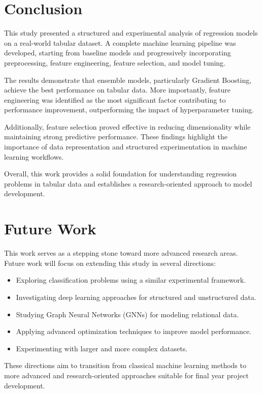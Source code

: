 \documentclass[conference]{IEEEtran}
\begin{document}
\section{Conclusion}

This study presented a structured and experimental analysis of regression models on a real-world tabular dataset. A complete machine learning pipeline was developed, starting from baseline models and progressively incorporating preprocessing, feature engineering, feature selection, and model tuning.

The results demonstrate that ensemble models, particularly Gradient Boosting, achieve the best performance on tabular data. More importantly, feature engineering was identified as the most significant factor contributing to performance improvement, outperforming the impact of hyperparameter tuning.

Additionally, feature selection proved effective in reducing dimensionality while maintaining strong predictive performance. These findings highlight the importance of data representation and structured experimentation in machine learning workflows.

Overall, this work provides a solid foundation for understanding regression problems in tabular data and establishes a research-oriented approach to model development.

\section{Future Work}

This work serves as a stepping stone toward more advanced research areas. Future work will focus on extending this study in several directions:

\begin{itemize}
\item Exploring classification problems using a similar experimental framework.
\item Investigating deep learning approaches for structured and unstructured data.
\item Studying Graph Neural Networks (GNNs) for modeling relational data.
\item Applying advanced optimization techniques to improve model performance.
\item Experimenting with larger and more complex datasets.
\end{itemize}

These directions aim to transition from classical machine learning methods to more advanced and research-oriented approaches suitable for final year project development.
\end{document}
